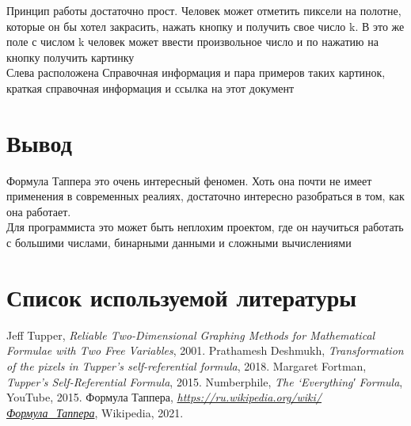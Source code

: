 \documentclass[a4paper,12pt]{article}
\begin{document}
Принцип работы достаточно прост. Человек может отметить пиксели на полотне, которые он бы хотел закрасить, нажать кнопку и получить свое число k. В это же поле с числом k человек может ввести произвольное число и по нажатию на кнопку получить картинку\\

Слева расположена Справочная информация и пара примеров таких картинок, краткая справочная информация и ссылка на этот документ\\

\section{Вывод}
Формула Таппера это очень интересный феномен. Хоть она почти не имеет применения в современных реалиях, достаточно интересно разобраться в том, как она работает.\\

Для программиста это может быть неплохим проектом, где он научиться работать с большими числами, бинарными данными и сложными вычислениями\\

\renewcommand*{\refname}{\vspace*{-2em}}
\section{Список используемой литературы}
\begin{thebibliography}{9}
	 Jeff Tupper, \emph{Reliable Two-Dimensional Graphing Methods
for Mathematical Formulae with Two Free Variables}, 2001.
	 Prathamesh Deshmukh, \emph{Transformation of the pixels in Tupper's self-referential formula}, 2018.
	 Margaret Fortman, \emph{Tupper’s Self-Referential Formula}, 2015.
	 Numberphile, \emph{The ‘Everything′ Formula}, YouTube, 2015.
	 Формула Таппера, \emph{\url{https://ru.wikipedia.org/wiki/Формула_Таппера}}, Wikipedia, 2021.
\end{thebibliography}
\end{document}
